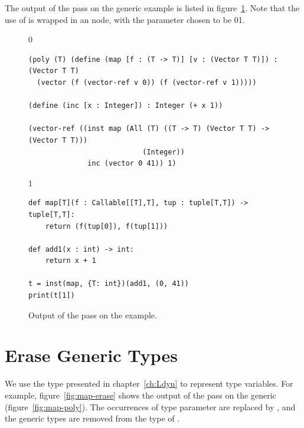 \documentclass[7x10]{TimesAPriori_MIT}%
\def\racketEd{0}
\def\pythonEd{1}
\def\edition{1}
\newcommand{\racket}[1]{{\if\edition\racketEd{#1}\fi}}
\newcommand{\pythonColor}[0]{}
\newcommand{\python}[1]{{\if\edition\pythonEd\pythonColor #1\fi}}
\numberwithin{theorem}{chapter}
\numberwithin{definition}{chapter}
\numberwithin{equation}{chapter}
\begin{document}
The output of the  pass on the generic 
example is listed in figure~\ref{fig:map-resolve}. Note that the use
of  is wrapped in an  node, with the parameter
 chosen to be \racket{}\python{}.

\begin{figure}[tbp]
\begin{tcolorbox}[colback=white]  
{\if\edition\racketEd    
\begin{lstlisting}
(poly (T) (define (map [f : (T -> T)] [v : (Vector T T)]) : (Vector T T)
  (vector (f (vector-ref v 0)) (f (vector-ref v 1)))))

(define (inc [x : Integer]) : Integer (+ x 1))

(vector-ref ((inst map (All (T) ((T -> T) (Vector T T) -> (Vector T T)))
                           (Integer))
              inc (vector 0 41)) 1)
\end{lstlisting}
\fi}
{\if\edition\pythonEd\pythonColor
\begin{lstlisting}
def map[T](f : Callable[[T],T], tup : tuple[T,T]) -> tuple[T,T]:
    return (f(tup[0]), f(tup[1]))

def add1(x : int) -> int:
    return x + 1

t = inst(map, {T: int})(add1, (0, 41))
print(t[1])
\end{lstlisting}
\fi}
\end{tcolorbox}
\caption{Output of the  pass on the  example.}
\label{fig:map-resolve}
\end{figure}

\section{Erase Generic Types}
\label{sec:erase_types}

We use the \CANYTY{} type presented in chapter~\ref{ch:Ldyn} to
represent type variables. For example, figure~\ref{fig:map-erase}
shows the output of the  pass on the generic
 (figure~\ref{fig:map-poly}). The occurrences of
type parameter  are replaced by \CANYTY{}, and the generic
 types are removed from the type of . 
\end{document}
